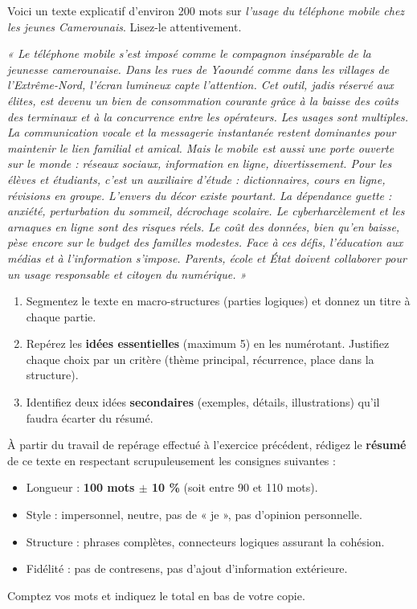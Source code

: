 \documentclass[11pt]{article}
\begin{document}
\begin{exercice}
Voici un texte explicatif d'environ 200 mots sur \emph{l'usage du téléphone mobile chez les jeunes Camerounais}. Lisez-le attentivement.

\textit{« Le téléphone mobile s'est imposé comme le compagnon inséparable de la jeunesse camerounaise. Dans les rues de Yaoundé comme dans les villages de l'Extrême-Nord, l'écran lumineux capte l'attention. Cet outil, jadis réservé aux élites, est devenu un bien de consommation courante grâce à la baisse des coûts des terminaux et à la concurrence entre les opérateurs. Les usages sont multiples. La communication vocale et la messagerie instantanée restent dominantes pour maintenir le lien familial et amical. Mais le mobile est aussi une porte ouverte sur le monde : réseaux sociaux, information en ligne, divertissement. Pour les élèves et étudiants, c'est un auxiliaire d'étude : dictionnaires, cours en ligne, révisions en groupe. L'envers du décor existe pourtant. La dépendance guette : anxiété, perturbation du sommeil, décrochage scolaire. Le cyberharcèlement et les arnaques en ligne sont des risques réels. Le coût des données, bien qu'en baisse, pèse encore sur le budget des familles modestes. Face à ces défis, l'éducation aux médias et à l'information s'impose. Parents, école et État doivent collaborer pour un usage responsable et citoyen du numérique. »}

\begin{enumerate}
\item Segmentez le texte en macro-structures (parties logiques) et donnez un titre à chaque partie.
\item Repérez les \textbf{idées essentielles} (maximum 5) en les numérotant. Justifiez chaque choix par un critère (thème principal, récurrence, place dans la structure).
\item Identifiez deux idées \textbf{secondaires} (exemples, détails, illustrations) qu'il faudra écarter du résumé.
\end{enumerate}
\end{exercice}

\begin{exercice}
À partir du travail de repérage effectué à l'exercice précédent, rédigez le \textbf{résumé} de ce texte en respectant scrupuleusement les consignes suivantes :
\begin{itemize}
\item Longueur : \textbf{100 mots $\pm$ 10 \%} (soit entre 90 et 110 mots).
\item Style : impersonnel, neutre, pas de « je », pas d'opinion personnelle.
\item Structure : phrases complètes, connecteurs logiques assurant la cohésion.
\item Fidélité : pas de contresens, pas d'ajout d'information extérieure.
\end{itemize}
Comptez vos mots et indiquez le total en bas de votre copie.
\end{exercice}
\end{document}
